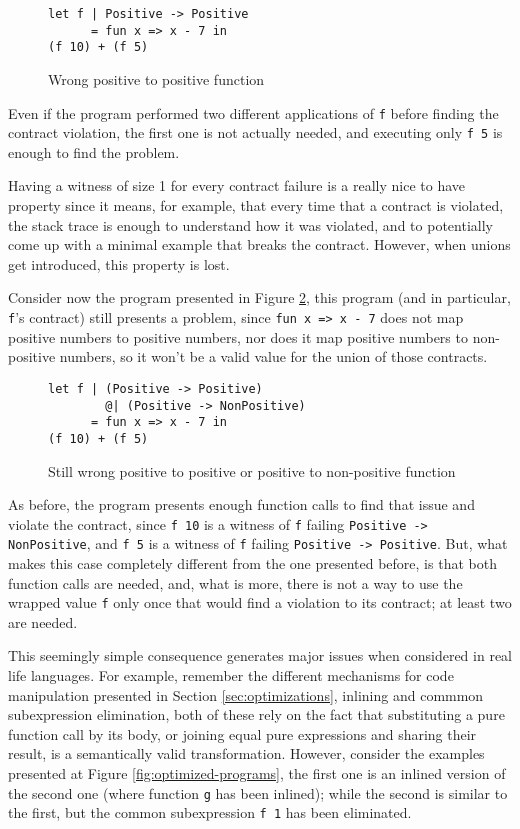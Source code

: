 \documentclass[sigplan,10pt,review,anonymous]{acmart}
\newcommand{\nickel}[1]{\lstinline[language=nickel]{#1}}
\begin{document}
\begin{figure}[h]
\begin{lstlisting}[language=nickel]
let f | Positive -> Positive
      = fun x => x - 7 in
(f 10) + (f 5)
\end{lstlisting}
\caption{Wrong positive to positive function}
\label{fig:pos-to-pos}
\end{figure}

Even if the program performed two different applications of \nickel{f}
before finding the contract violation, the first one is not actually
needed, and executing only \nickel{f 5} is enough to find the problem.

Having a witness of size 1 for every contract failure is a really nice to have property
since it means, for example, that every time that a contract is violated,
the stack trace is enough to understand how it was violated, and to potentially
come up with a minimal example that breaks the contract.
However, when unions get introduced, this property is lost.

Consider now the program presented in Figure \ref{fig:wrong-union-function},
this program (and in particular, \nickel{f}'s contract) still presents a problem,
since \nickel{fun x => x - 7} does not map positive numbers to positive numbers,
nor does it map positive numbers to non-positive numbers, so it won't be a valid
value for the union of those contracts.


\begin{figure}[h]
\begin{lstlisting}[language=nickel]
let f | (Positive -> Positive)
        @| (Positive -> NonPositive)
      = fun x => x - 7 in
(f 10) + (f 5)
\end{lstlisting}
\caption{Still wrong positive to positive or positive to non-positive function}
\label{fig:wrong-union-function}
\end{figure}

As before, the program presents enough function calls to find that issue
and violate the contract,
since \nickel{f 10} is a witness of \nickel{f} failing \nickel{Positive -> NonPositive},
and \nickel{f 5} is a witness of \nickel{f} failing \nickel{Positive -> Positive}.
But, what makes this case completely different from the one presented before, is that
both function calls are needed, and, what is more, there is not a way to
use the wrapped value \nickel{f} only once that would find a violation to its contract;
at least two are needed.

This seemingly simple consequence generates major issues when considered in real
life languages.
For example, remember the different mechanisms for code manipulation presented
in Section \ref{sec:optimizations}, inlining and commmon subexpression elimination,
both of these rely on the fact that substituting a pure function call by its body,
or joining equal pure expressions and sharing their result, is a semantically valid
transformation.
However, consider the examples presented at Figure \ref{fig:optimized-programs},
the first one is an inlined version of the second one (where function
\nickel{g} has been inlined); while the second is similar to the first, but
the common subexpression \nickel{f 1} has been eliminated.
\end{document}
